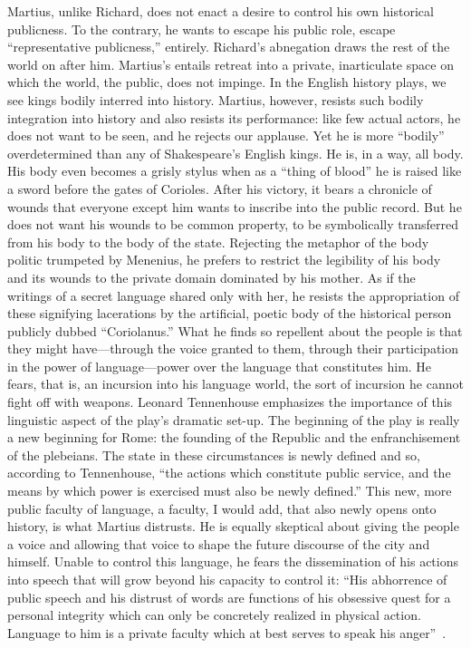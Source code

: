 Martius, unlike Richard, does not enact a desire to control his own historical publicness.
To the contrary, he wants to escape his public role, escape ``representative publicness,'' entirely.
Richard's abnegation draws the rest of the world on after him. Martius's entails retreat into a private, inarticulate space on which the world, the public, does not impinge.
In the English history plays, we see kings bodily interred into history.
Martius, however, resists such bodily integration into history and also resists its performance: like few actual actors, he does not want to be seen, and he rejects our applause.
Yet he is more ``bodily'' overdetermined than any of Shakespeare's English kings.
He is, in a way, all body.
His body even becomes a grisly stylus when as a ``thing of blood'' he is raised like a sword before the gates of Corioles.
After his victory, it bears a chronicle of wounds that everyone except him wants to inscribe into the public record.
But he does not want his wounds to be common property, to be symbolically transferred from his body to the body of the state.
Rejecting the metaphor of the body politic trumpeted by Menenius, he prefers to restrict the legibility of his body and its wounds to the private domain dominated by his mother.
As if the writings of a secret language shared only with her, he resists the appropriation of these signifying lacerations by the artificial, poetic body of the historical person publicly dubbed ``Coriolanus.''
What he finds so repellent about the people is that they might have---through the voice granted to them, through their participation in the power of language---power over the language that constitutes him.
He fears, that is, an incursion into his language world, the sort of incursion he cannot fight off with weapons.
Leonard Tennenhouse emphasizes the importance of this linguistic aspect of the play's dramatic set-up.
The beginning of the play is really a new beginning for Rome: the founding of the Republic and the enfranchisement of the plebeians.
The state in these circumstances is newly defined and so, according to Tennenhouse, ``the actions which constitute public service, and the means by which power is exercised must also be newly defined.''
This new, more public faculty of language, a faculty, I would add, that also newly opens onto history, is what Martius distrusts.
He is equally skeptical about giving the people a voice and allowing that voice to shape the future discourse of the city and himself.
Unable to control this language, he fears the dissemination of his actions into speech that will grow beyond his capacity to control it:
``His abhorrence of public speech and his distrust of words are functions of his obsessive quest for a personal integrity which can only be concretely realized in physical action.
Language to him is a private faculty which at best serves to speak his anger''~\cite[223]{tennenhouse_coriolanus:_1986}.

